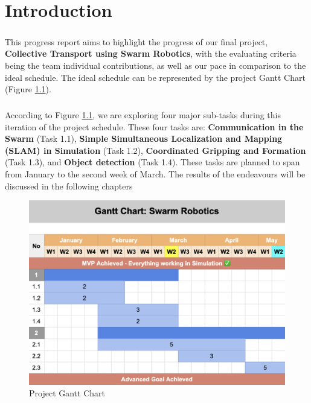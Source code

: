 \chapter{Introduction}

\paragraph*{}
This progress report aims to highlight the progress of our final project, \textbf{Collective Transport using Swarm Robotics}, with the evaluating criteria being the team individual contributions, as well as our pace in comparison to the ideal schedule. The ideal schedule can be represented by the project Gantt Chart (Figure \ref{fig:gantt_chart}).

\paragraph*{}
According to Figure \ref{fig:gantt_chart}, we are exploring four major sub-tasks during this iteration of the project schedule. These four tasks are: \textbf{Communication in the Swarm} (Task 1.1), \textbf{Simple Simultaneous Localization and Mapping (SLAM) in Simulation} (Task 1.2), \textbf{Coordinated Gripping and Formation} (Task 1.3), and \textbf{Object detection} (Task 1.4). These tasks are planned to span from January to the second week of March. The results of the endeavours will be discussed in the following chapters

\begin{figure}[H]
    \centering
    \includegraphics[width=1\linewidth]{assets/images/timeline/gantt_chart.png}
    \caption{Project Gantt Chart}
    \label{fig:gantt_chart}
\end{figure}

